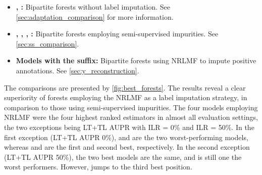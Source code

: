 \begin{itemize}
    \item \textbf{, :}
    Bipartite forests without label imputation.
    See \autoref{sec:adaptation_comparison} for more information.
    \item \textbf{, , , :}
    Bipartite forests employing semi-supervised impurities.
    See \autoref{sec:ss_comparison}.
    \item \textbf{Models with the  suffix:} 
    Bipartite forests using NRLMF to impute positive annotations.
    See \autoref{sec:y_reconstruction}.
\end{itemize}



The comparisons are presented by \autoref{fig:best_forests}. The results reveal a clear superiority of forests employing the NRLMF as a label imputation strategy, in comparison to those using semi-supervised impurities. The four models employing NRLMF were the four highest ranked estimators in almost all evaluation settings, the two exceptions being LT+TL AUPR with ILR = 0\% and ILR = 50\%. In the first exception (LT+TL AUPR 0\%),  and  are the two worst-performing models, whereas  and  are the first and second best, respectively. In the second exception (LT+TL AUPR 50\%), the two best models are the same, and  is still one the worst performers. However,  jumps to the third best position. 



